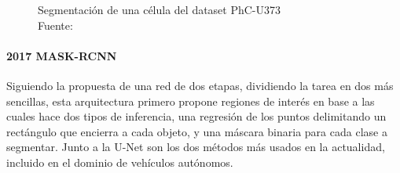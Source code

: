 \begin{figure}[H]
    \centering
    \qquad
    \caption[Segmentación de una célula del dataset PhC-U373]{Segmentación de una célula del dataset PhC-U373\\Fuente: \citep{u-net}}%
    \label{unet}%
\end{figure}


\paragraph{2017 MASK-RCNN}
Siguiendo la propuesta de una red de dos etapas, dividiendo la tarea en dos más sencillas, esta arquitectura primero propone regiones de interés en base a las cuales hace dos tipos de inferencia, una regresión de los puntos delimitando un rectángulo que encierra a cada objeto, y una máscara binaria para cada clase a segmentar. \citep{mask-rcnn} Junto a la U-Net son los dos métodos más usados en la actualidad, incluido en el dominio de vehículos autónomos.


